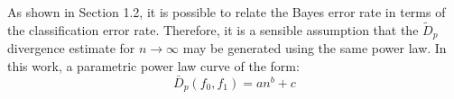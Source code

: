 \documentclass{article}
\begin{document}
	\indent As shown in Section 1.2, it is possible to relate the Bayes error rate in terms of the classification error rate. Therefore, it is a sensible assumption that the $\widetilde{D}_p$ divergence estimate for $n \rightarrow \infty$ may be generated using the same power law. In this work, a parametric power law curve of the form:
	\begin{equation}
		\bar{D}_p(f_0,f_1)=an^b+c
	\end{equation}
	
\end{document}
